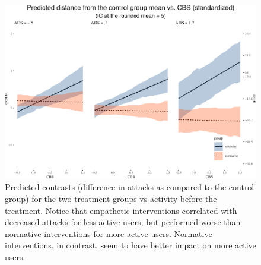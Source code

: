 \documentclass[preprint,12pt]{elsarticle}
\begin{document}
\begin{figure}

\begin{center}\includegraphics[width=1\linewidth]{ figures/unnamed-chunk-7-1} \end{center}
\caption{Predicted contrasts (difference in attacks as compared to the control group)
for the two treatment groups vs activity before the treatment. Notice that
empathetic interventions correlated with decreased attacks for less active
users, but performed worse than normative interventions for more active
users. Normative interventions, in contrast, seem to have better impact on
 more active users.}
\label{fig:ContrastCBS}
\end{figure}
\end{document}
